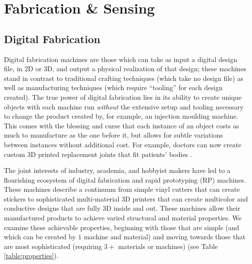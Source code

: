 \chapter{Fabrication \& Sensing}

\section{Digital Fabrication}

Digital fabrication machines are those which can take as input a digital design file, in 2D or 3D, and output a physical realization of that design; these machines stand in contrast to traditional crafting techniques (which take no design file) as well as manufacturing techniques (which require ``tooling'' for each design created). The true power of digital fabrication lies in its ability to create unique objects with each machine run \emph{without} the extensive setup and tooling necessary to change the product created by, for example, an injection moulding machine. This comes with the blessing and curse that each instance of an object costs as much to manufacture as the one before it, but allows for subtle variations between instances without additional cost. For example, doctors can now create custom 3D printed replacement joints that fit patients' bodies \cite{findref}.

The joint interests of industry, academia, and hobbyist makers have led to a flourishing ecosystem of digital fabrication and rapid prototyping (RP) machines. These machines describe a continuum from simple vinyl cutters that can create stickers to sophisticated multi-material 3D printers that can create multicolor and conductive designs that are fully 3D inside and out. These machines allow their manufactured products to achieve varied structural and material properties. We examine these achievable properties, beginning with those that are simple (and which can be created by $1$ machine and material) and moving towards those that are most sophisticated (requiring $3+$ materials or machines) (see Table \ref{table:properties}).

